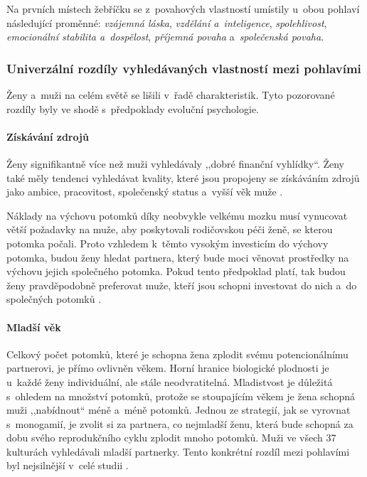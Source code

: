\documentclass[a4paper, 12pt, notitlepage, oneside, numbers=noenddot]{report}
\begin{document}
Na prvních místech žebříčku se z~povahových vlastností umístily u~obou
pohlaví následující proměnné: \emph{vzájemná láska}, \emph{vzdělání
  a~inteligence}, \emph{spolehlivost}, \emph{emocionální stabilita
  a~dospělost}, \emph{pří\-jem\-ná povaha} a~\emph{společenská
  povaha}.

\subsubsection{Univerzální rozdíly vyhledávaných vlastností mezi pohlavími}

Ženy a~muži na celém světě se lišili v~řadě charakteristik.  Tyto
pozorované rozdíly byly ve shodě s~předpoklady evoluční psychologie.

\paragraph{Získávání zdrojů}

Ženy signifikantně více než muži vyhledávaly ,,dobré finanční
vy\-hlídky``.  Ženy také měly tendenci vyhledávat kvality, které jsou
propojeny se získáváním zdrojů jako ambice, pracovitost, společenský
status a~vyšší věk muže \citep{Buss2007}.

Náklady na výchovu potomků díky neobvykle velkému mozku musí vynucovat
větší požadavky na muže, aby poskytovali rodičovskou péči ženě, se
kterou potomka počali.  Proto vzhledem k~těmto vysokým investicím do
výchovy potomka, budou ženy hledat partnera, který bude moci věnovat
prostředky na výchovu jejich společného potomka.  Pokud tento
předpoklad platí, tak budou ženy pravděpodobně preferovat muže, kteří
jsou schopni investovat do nich a~do společných potomků
\citep{Trivers1972,Ridley2007}.

\paragraph{Mladší věk}

Celkový počet potomků, které je schopna žena zplodit svému
poten\-cionál\-ní\-mu partnerovi, je přímo ovlivněn věkem.  Horní hranice
biologické plodnosti je u~každé ženy individuální, ale stále
neodvratitelná.  Mladistvost je důležitá s~ohledem na množství
potomků, protože se stoupajícím věkem je žena schopná muži
,,nabídnout`` méně a~méně potomků.  Jednou ze strategií, jak se
vyrovnat s~monogamií, je zvolit si za partnera, co nejmladší ženu,
která bude schopná za dobu svého reprodukčního cyklu zplodit mnoho
potomků.  Muži ve všech 37 kulturách vyhledávali mladší partnerky.
Tento konkrétní rozdíl mezi pohlavími byl nejsilnější v~celé studii
\citep{BussEtAl1990, Buss2007}.
\end{document}
